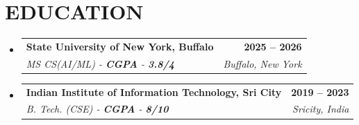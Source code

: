 \documentclass[letterpaper,11pt]{article}
\makeatletter
\newcommand{\resumeSubheading}[4]{\vspace{-2pt}\item\begin{tabular*}{1.0\textwidth}[t]{l@{\extracolsep{\fill}}r}\textbf{\large#1} & \textbf{\small #2} \\ \textit{\large#3} & \textit{\small #4} \\ \end{tabular*}\vspace{-7pt}}
\newcommand{\resumeSubHeadingListStart}{\begin{itemize}[leftmargin=0.0in, label={}]}
\newcommand{\resumeSubHeadingListEnd}{\end{itemize}}
\makeatother
\begin{document}
\section{EDUCATION}
  \resumeSubHeadingListStart
    \resumeSubheading
      {State University of New York, Buffalo}{2025 -- 2026}
      {MS CS(AI/ML) - \textbf{CGPA} - \textbf{3.8/4}}{Buffalo, New York}
    \resumeSubheading
      {Indian Institute of Information Technology, Sri City}{2019 -- 2023}
      {B. Tech. (CSE) - \textbf{CGPA} - \textbf{8/10}}{Sricity, India}
  \resumeSubHeadingListEnd
\end{document}
